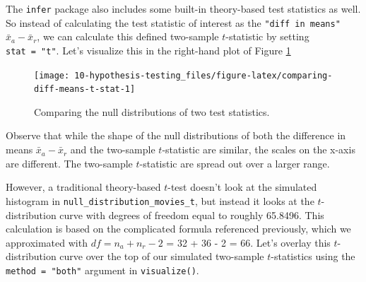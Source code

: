 \documentclass[
]{book}
\newenvironment{Shaded}{\begin{snugshade}}{\end{snugshade}}
\newcommand{\CommentTok}[1]{\textcolor[rgb]{0.56,0.35,0.01}{\textit{#1}}}
\newcommand{\DataTypeTok}[1]{\textcolor[rgb]{0.13,0.29,0.53}{#1}}
\newcommand{\DecValTok}[1]{\textcolor[rgb]{0.00,0.00,0.81}{#1}}
\newcommand{\KeywordTok}[1]{\textcolor[rgb]{0.13,0.29,0.53}{\textbf{#1}}}
\newcommand{\NormalTok}[1]{#1}
\newcommand{\OperatorTok}[1]{\textcolor[rgb]{0.81,0.36,0.00}{\textbf{#1}}}
\newcommand{\StringTok}[1]{\textcolor[rgb]{0.31,0.60,0.02}{#1}}
\begin{document}
The \texttt{infer} package also includes some built-in theory-based test statistics as well. So instead of calculating the test statistic of interest as the \texttt{"diff\ in\ means"} \(\bar{x}_a - \bar{x}_r\), we can calculate this defined two-sample \(t\)-statistic by setting \texttt{stat\ =\ "t"}. Let's visualize this in the right-hand plot of Figure \ref{fig:comparing-diff-means-t-stat}

\begin{Shaded}
\end{Shaded}

\begin{figure}

{\centering \texttt{[image: 10-hypothesis-testing\_files/figure-latex/comparing-diff-means-t-stat-1]} 

}

\caption{Comparing the null distributions of two test statistics.}\label{fig:comparing-diff-means-t-stat}
\end{figure}

Observe that while the shape of the null distributions of both the difference in means \(\bar{x}_a - \bar{x}_r\) and the two-sample \(t\)-statistic are similar, the scales on the x-axis are different. The two-sample \(t\)-statistic are spread out over a larger range.

However, a traditional theory-based \(t\)-test doesn't look at the simulated histogram in \texttt{null\_distribution\_movies\_t}, but instead it looks at the \(t\)-distribution curve with degrees of freedom equal to roughly 65.8496. This calculation is based on the complicated formula referenced previously, which we approximated with \(df = n_a + n_r - 2\) = 32 + 36 - 2 = 66. Let's overlay this \(t\)-distribution curve over the top of our simulated two-sample \(t\)-statistics using the \texttt{method\ =\ "both"} argument in \texttt{visualize()}.
\end{document}
